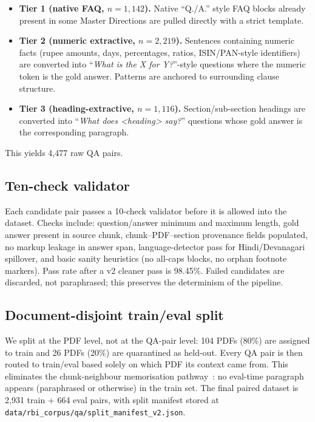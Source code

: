 \documentclass{article}
\begin{document}
\begin{itemize}
  \item \textbf{Tier 1 (native FAQ, $n{=}1{,}142$).} Native ``Q./A.'' style FAQ blocks already present in some Master Directions are pulled directly with a strict template.
  \item \textbf{Tier 2 (numeric extractive, $n{=}2{,}219$).} Sentences containing numeric facts (rupee amounts, days, percentages, ratios, ISIN/PAN-style identifiers) are converted into ``\emph{What is the X for Y?}''-style questions where the numeric token is the gold answer. Patterns are anchored to surrounding clause structure.
  \item \textbf{Tier 3 (heading-extractive, $n{=}1{,}116$).} Section/sub-section headings are converted into ``\emph{What does \textless heading\textgreater{} say?}'' questions whose gold answer is the corresponding paragraph.
\end{itemize}

This yields 4{,}477 raw QA pairs.

\subsection{Ten-check validator}

Each candidate pair passes a 10-check validator before it is allowed into the dataset. Checks include: question/answer minimum and maximum length, gold answer present in source chunk, chunk--PDF--section provenance fields populated, no markup leakage in answer span, language-detector pass for Hindi/Devanagari spillover, and basic sanity heuristics (no all-caps blocks, no orphan footnote markers). Pass rate after a v2 cleaner pass is 98.45\%. Failed candidates are discarded, not paraphrased; this preserves the determinism of the pipeline.

\subsection{Document-disjoint train/eval split}
\label{sec:split}

We split at the PDF level, not at the QA-pair level: 104 PDFs (80\%) are assigned to train and 26 PDFs (20\%) are quarantined as held-out. Every QA pair is then routed to train/eval based solely on which PDF its context came from. This eliminates the chunk-neighbour memorisation pathway~\citep{magar2022data}: no eval-time paragraph appears (paraphrased or otherwise) in the train set. The final paired dataset is 2{,}931 train + 664 eval pairs, with split manifest stored at \texttt{data/rbi\_corpus/qa/split\_manifest\_v2.json}.
\end{document}
